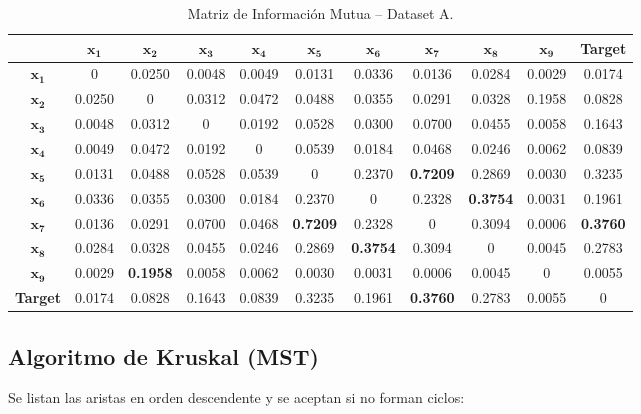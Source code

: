 \documentclass[12pt,a4paper]{article}
\begin{document}
\begin{table}[H]
    \centering
    \footnotesize
    \begin{tabular}{c|cccccccccc}
        \toprule
        & $\mathbf{x_1}$ & $\mathbf{x_2}$ & $\mathbf{x_3}$ & $\mathbf{x_4}$ & $\mathbf{x_5}$ & $\mathbf{x_6}$ & $\mathbf{x_7}$ & $\mathbf{x_8}$ & $\mathbf{x_9}$ & \textbf{Target} \\
        \midrule
        $\mathbf{x_1}$ & 0 & 0.0250 & 0.0048 & 0.0049 & 0.0131 & 0.0336 & 0.0136 & 0.0284 & 0.0029 & 0.0174 \\
        $\mathbf{x_2}$ & 0.0250 & 0 & 0.0312 & 0.0472 & 0.0488 & 0.0355 & 0.0291 & 0.0328 & 0.1958 & 0.0828 \\
        $\mathbf{x_3}$ & 0.0048 & 0.0312 & 0 & 0.0192 & 0.0528 & 0.0300 & 0.0700 & 0.0455 & 0.0058 & 0.1643 \\
        $\mathbf{x_4}$ & 0.0049 & 0.0472 & 0.0192 & 0 & 0.0539 & 0.0184 & 0.0468 & 0.0246 & 0.0062 & 0.0839 \\
        $\mathbf{x_5}$ & 0.0131 & 0.0488 & 0.0528 & 0.0539 & 0 & 0.2370 & \textbf{0.7209} & 0.2869 & 0.0030 & 0.3235 \\
        $\mathbf{x_6}$ & 0.0336 & 0.0355 & 0.0300 & 0.0184 & 0.2370 & 0 & 0.2328 & \textbf{0.3754} & 0.0031 & 0.1961 \\
        $\mathbf{x_7}$ & 0.0136 & 0.0291 & 0.0700 & 0.0468 & \textbf{0.7209} & 0.2328 & 0 & 0.3094 & 0.0006 & \textbf{0.3760} \\
        $\mathbf{x_8}$ & 0.0284 & 0.0328 & 0.0455 & 0.0246 & 0.2869 & \textbf{0.3754} & 0.3094 & 0 & 0.0045 & 0.2783 \\
        $\mathbf{x_9}$ & 0.0029 & \textbf{0.1958} & 0.0058 & 0.0062 & 0.0030 & 0.0031 & 0.0006 & 0.0045 & 0 & 0.0055 \\
        \textbf{Target} & 0.0174 & 0.0828 & 0.1643 & 0.0839 & 0.3235 & 0.1961 & \textbf{0.3760} & 0.2783 & 0.0055 & 0 \\
        \bottomrule
    \end{tabular}
    \caption{Matriz de Información Mutua -- Dataset A.}
\end{table}

\subsection{Algoritmo de Kruskal (MST)}
Se listan las aristas en orden descendente y se aceptan si no forman ciclos:
\end{document}
